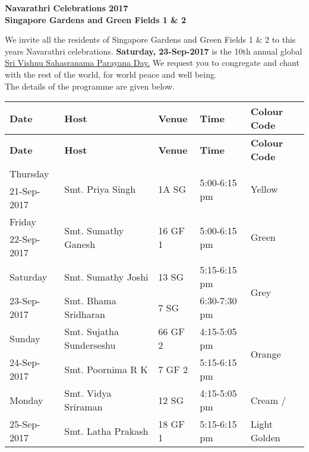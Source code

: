 \documentclass[12pt]{article}
\begin{document}
\pagestyle{empty}
\begin{center}
\textbf{Navarathri Celebrations 2017\\Singapore Gardens and Green Fields 1 \& 2}\\
\end{center}
We invite all the residents of Singapore Gardens and Green Fields 1 \& 2 to this year\textquotesingle s Navarathri celebrations. \textbf{Saturday, 23-Sep-2017} is the 10th annual global  \underline{\textquotesingle Sri Vishnu Sahasranama Parayana Day\textquotesingle .} We request you to congregate and chant with the rest of the world, for world peace and well being. \\The details of the programme are given below. 
\begin{center}
\begin{longtable}{|p{}|p{}|p{}|p{}|p{}|}
\hline \textbf{Date}&\textbf{Host}&\textbf{Venue}&\textbf{Time}&\textbf{Colour Code}\\\hline
\endfirsthead
\hline \textbf{Date}&\textbf{Host}&\textbf{Venue}&\textbf{Time}&\textbf{Colour Code}\\\hline
\endhead

Thursday&\multirow{2}{*}{Smt. Priya Singh}&\multirow{2}{*}{1A SG}&\multirow{2}{*}{5:00-6:15 pm}&\multirow{2}{*}{Yellow}\\
21-Sep-2017&&&&\\\hline

Friday&\multirow{2}{*}{Smt. Sumathy Ganesh}&\multirow{2}{*}{16 GF 1}&\multirow{2}{*}{5:00-6:15 pm}&\multirow{2}{*}{Green}\\
22-Sep-2017&&&&\\\hline\hline

Saturday &Smt. Sumathy Joshi&13 SG&5:15-6:15 pm&\multirow{2}{*}{Grey}\\\cline{2-4}
23-Sep-2017&Smt. Bhama Sridharan&7 SG&6:30-7:30 pm&\\\hline\hline

Sunday &Smt. Sujatha Sunderseshu&66 GF 2&4:15-5:05 pm&\multirow{2}{*}{Orange}\\\cline{2-4}
24-Sep-2017&Smt. Poornima R K&7 GF 2&5:15-6:15 pm&\\\hline

Monday &Smt. Vidya Sriraman&12 SG&4:15-5:05 pm&Cream / \\\cline{2-4}
25-Sep-2017&Smt. Latha Prakash&18 GF 1&5:15-6:15 pm&Light Golden\\\hline


\end{longtable}
\end{center}
\end{document}
